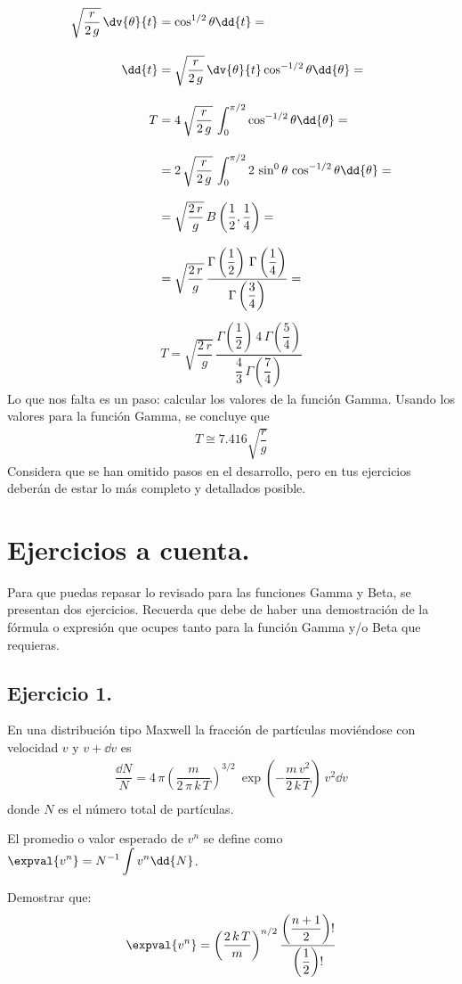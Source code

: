 \begin{align*}
\sqrt{\dfrac{r}{2 \, g}} \, \dv{\theta}{t} &= \cos^{1/2} \theta \dd{t} = \\[1em]
\dd{t} &= \sqrt{\dfrac{r}{2 \, g}} \, \dv{\theta}{t} \cos^{-1/2} \theta \dd{\theta} = \\[1em]
T &= 4 \, \sqrt{\dfrac{r}{2 \, g}} \, \int_{0}^{\pi/2} \cos^{-1/2} \theta \dd{\theta} = \\[1em]
&= 2 \, \sqrt{\dfrac{r}{2 \, g}} \, \int_{0}^{\pi/2} 2 \, \sin^{0} \theta \, \cos^{-1/2} \theta \dd{\theta} = \\[0.8em]
&= \sqrt{\dfrac{2 \, r}{g}} \, B \left( \dfrac{1}{2}, \dfrac{1}{4} \right) = \\[0.8em]
&= \sqrt{\dfrac{2 \, r}{g}} \, \dfrac{\Gamma \left(\dfrac{1}{2} \right) \, \Gamma \left(\dfrac{1}{4} \right)}{\Gamma \left(\dfrac{3}{4} \right)} = 
\end{align*}
\begin{align*}
T = \sqrt{\dfrac{2 \, r}{g}} \, \dfrac{\Gamma \left(\dfrac{1}{2} \right) \, 4 \, \Gamma \left(\dfrac{5}{4} \right)}{\dfrac{4}{3} \, \Gamma \left(\dfrac{7}{4} \right)}
\end{align*}
Lo que nos falta es un paso: calcular los valores de la función Gamma. Usando los valores para la función Gamma, se concluye que
\begin{align*}
T \cong 7.416 \sqrt{\dfrac{r}{g}}
\end{align*}
Considera que se han omitido pasos en el desarrollo, pero en tus ejercicios deberán de estar lo más completo y detallados posible.
\section{Ejercicios a cuenta.}
Para que puedas repasar lo revisado para las funciones Gamma y Beta, se presentan dos ejercicios. Recuerda que debe de haber una demostración de la fórmula o expresión que ocupes tanto para la función Gamma y/o Beta que requieras.
\subsection{Ejercicio 1.}
En una distribución tipo Maxwell la fracción de partículas moviéndose con velocidad $v$ y $v +\dd{v}$ es
\begin{align*}
\dfrac{\dd{N}}{N} = 4 \, \pi \left( \dfrac{m}{2 \, \pi \, k \, T} \right)^{3/2} \: \exp \left( - \dfrac{m \, v^{2}}{2 \, k \, T} \right) \: v^{2} \dd{v}
\end{align*}
donde $N$ es el número total de partículas. 
\par
El promedio o valor esperado de $v^{n}$ se define como $\displaystyle \expval{v^{n}} = N^{-1} \int v^{n} \dd{N}$.
\par
Demostrar que:
\begin{align*}
\expval{v^{n}} = \left( \dfrac{2 \, k \, T}{m} \right)^{n/2} \dfrac{\left( \dfrac{n + 1}{2} \right) !} { \left( \dfrac{1}{2} \right) !}
\end{align*}

